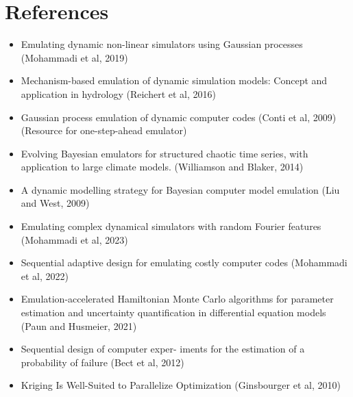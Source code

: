 \documentclass[12pt]{article}
\begin{document}
\section{References}
\begin{itemize}
\item Emulating dynamic non-linear simulators using Gaussian processes (Mohammadi et al, 2019)
\item Mechanism-based emulation of dynamic simulation models: Concept and application in hydrology (Reichert et al, 2016)
\item Gaussian process emulation of dynamic computer codes (Conti et al, 2009) (Resource for one-step-ahead emulator)
\item Evolving Bayesian emulators for structured chaotic time series, with application to large climate models. (Williamson and Blaker, 2014)
\item A dynamic modelling strategy for Bayesian computer model emulation (Liu and West, 2009)
\item Emulating complex dynamical simulators with random Fourier features (Mohammadi et al, 2023)
\item Sequential adaptive design for emulating costly computer codes (Mohammadi et al, 2022)
\item Emulation-accelerated Hamiltonian Monte Carlo algorithms for parameter estimation and uncertainty quantification in differential equation models (Paun and Husmeier, 2021)
\item Sequential design of computer exper- iments for the estimation of a probability of failure (Bect et al, 2012)
\item Kriging Is Well-Suited to Parallelize Optimization (Ginsbourger et al, 2010)
\end{itemize}
\end{document}
